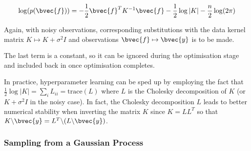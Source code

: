 				\begin{equation}
					\log(p(\bvec{f})) = - \frac{1}{2} \bvec{f}^{T} K^{-1} \bvec{f} - \frac{1}{2} \log|K| - \frac{n}{2} \log(2 \pi)
				\label{Background:GaussianProcess:Equation:LogMarginalLikelihood}
				\end{equation}
				
				Again, with noisy observations, corresponding substitutions with the data kernel matrix $K \mapsto K + \sigma^{2} I$ and observations $\bvec{f} \mapsto \bvec{y}$ is to be made.
				
				The last term is a constant, so it can be ignored during the optimisation stage and included back in once optimisation completes.
				
				In practice, hyperparameter learning can be sped up by employing the fact that $\frac{1}{2} \log|K| = \sum_{i} L_{ii} = \mathrm{trace}(L)$ where $L$ is the Cholesky decomposition of $K$ (or $K + \sigma^{2} I$ in the noisy case). In fact, the Cholesky decomposition $L$ leads to better numerical stability when inverting the matrix $K$ since $K = LL^{T}$ so that $K \backslash \bvec{y} = L^{T} \backslash (L \backslash \bvec{y})$.
			
			\subsubsection{Sampling from a Gaussian Process}
			
				

